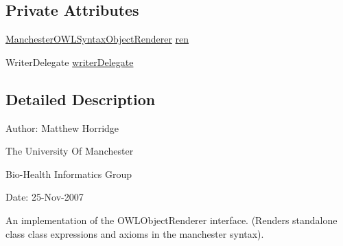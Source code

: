 \subsection*{Private Attributes}
\begin{DoxyCompactItemize}
\item 
\hyperlink{classuk_1_1ac_1_1manchester_1_1cs_1_1owl_1_1owlapi_1_1mansyntaxrenderer_1_1_manchester_o_w_l_syntax_object_renderer}{Manchester\-O\-W\-L\-Syntax\-Object\-Renderer} \hyperlink{classuk_1_1ac_1_1manchester_1_1cs_1_1owl_1_1owlapi_1_1mansyntaxrenderer_1_1_manchester_o_w_l_syntax_o_w_l_object_renderer_impl_aa02cf21d23343cf9a473fb4393ac02c2}{ren}
\item 
Writer\-Delegate \hyperlink{classuk_1_1ac_1_1manchester_1_1cs_1_1owl_1_1owlapi_1_1mansyntaxrenderer_1_1_manchester_o_w_l_syntax_o_w_l_object_renderer_impl_a890322ac19362b530b1c7bfe0a07b8fe}{writer\-Delegate}
\end{DoxyCompactItemize}


\subsection{Detailed Description}
Author\-: Matthew Horridge\par
 The University Of Manchester\par
 Bio-\/\-Health Informatics Group\par
 Date\-: 25-\/\-Nov-\/2007\par
\par


An implementation of the O\-W\-L\-Object\-Renderer interface. (Renders standalone class class expressions and axioms in the manchester syntax). 

